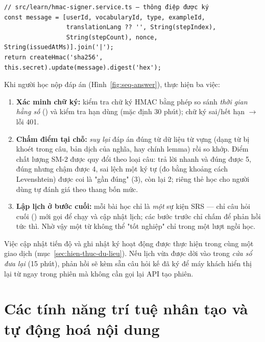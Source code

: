 \begin{verbatim}
// src/learn/hmac-signer.service.ts — thông điệp được ký
const message = [userId, vocabularyId, type, exampleId,
                 translationLang ?? '', String(stepIndex),
                 String(stepCount), nonce, String(issuedAtMs)].join('|');
return createHmac('sha256', this.secret).update(message).digest('hex');
\end{verbatim}

Khi người học nộp đáp án (Hình~\ref{fig:seq-answer}),  thực
hiện ba việc:

\begin{enumerate}
  \item \textbf{Xác minh chữ ký:} kiểm tra chữ ký HMAC bằng phép so sánh
        \textit{thời gian hằng số} () và kiểm tra hạn
        dùng (mặc định 30 phút); chữ ký sai/hết hạn $\rightarrow$ lỗi 401.
  \item \textbf{Chấm điểm tại chỗ:}  \textit{suy
        lại} đáp án đúng từ dữ liệu từ vựng (dạng từ bị khoét trong câu, bản
        dịch của nghĩa, hay chính lemma) rồi so khớp. Điểm chất lượng SM-2
        được quy đổi theo loại câu: trả lời nhanh và đúng được 5, đúng nhưng
        chậm được 4, sai lệch một ký tự (đo bằng khoảng cách Levenshtein) được
        coi là "gần đúng" (3), còn lại 2; riêng thẻ học cho người dùng tự đánh
        giá theo thang bốn mức.
  \item \textbf{Lập lịch ở bước cuối:} mỗi bài học chỉ là \textit{một} sự kiện
        SRS --- chỉ câu hỏi cuối () mới gọi
         để chạy  và cập nhật lịch; các bước
        trước chỉ chấm để phản hồi tức thì. Nhờ vậy một từ không thể "tốt
        nghiệp" chỉ trong một lượt ngồi học.
\end{enumerate}

Việc cập nhật tiến độ và ghi nhật ký hoạt động được thực hiện trong cùng một
giao dịch (mục~\ref{sec:hien-thuc-du-lieu}). Nếu lịch vừa được dời vào trong
\textit{cửa sổ đưa lại} (15 phút), phản hồi sẽ kèm sẵn câu hỏi kế đã ký để máy
khách hiển thị lại từ ngay trong phiên mà không cần gọi lại API tạo phiên.

\section{Các tính năng trí tuệ nhân tạo và tự động hoá nội dung}
\label{sec:ai-tu-dong}

